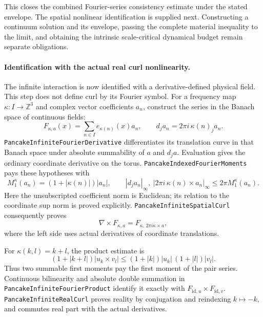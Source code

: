 \documentclass[11pt]{article}
\theoremstyle{definition}
\begin{document}
This closes the combined Fourier-series consistency estimate under the
stated envelope. The spatial nonlinear identification is supplied next.
Constructing a continuum solution and its envelope, passing the complete
material inequality to the limit, and obtaining the intrinsic
scale-critical dynamical budget remain separate obligations.

\paragraph{Identification with the actual real curl nonlinearity.}
The infinite interaction is now identified with a derivative-defined
physical field. This step does not define curl by its Fourier symbol.
For a frequency map $\kappa:I\to\mathbb Z^3$ and complex vector coefficients
$a_n$, construct the series in the Banach space of continuous fields:
\[
 F_{\kappa,a}(x)=\sum_{n\in I}e_{\kappa(n)}(x)a_n,\qquad
 d_j a_n=2\pi i\,\kappa(n)_j a_n.
\]
\texttt{PancakeInfiniteFourierDerivative} differentiates its translation
curve in that Banach space under absolute summability of $a$ and $d_ja$.
Evaluation gives the ordinary coordinate derivative on the torus.
\texttt{PancakeIndexedFourierMoments} pays these hypotheses with
\[
 M_1^\kappa(a_n)=(1+|\kappa(n)|)|a_n|,\qquad
 |d_ja_n|_\infty,\ |2\pi i\,\kappa(n)\times a_n|_\infty
       \le 2\pi M_1^\kappa(a_n).
\]
Here the unsubscripted coefficient norm is Euclidean; its relation to the
coordinate sup norm is proved explicitly.
\texttt{PancakeInfiniteSpatialCurl} consequently proves
\[
 \nabla\times F_{\kappa,a}
   = F_{\kappa,\,2\pi i\kappa\times a},
\]
where the left side uses actual derivatives of coordinate translations.

For $\kappa(k,l)=k+l$, the product estimate is
\[
 (1+|k+l|)|u_k\times v_l|
       \le (1+|k|)|u_k|\,(1+|l|)|v_l|.
\]
Thus two summable first moments pay the first moment of the pair series.
Continuous bilinearity and absolute double summation in
\texttt{PancakeInfiniteFourierProduct} identify it exactly with
$F_{\mathrm{id},u}\times F_{\mathrm{id},v}$.
\texttt{PancakeInfiniteRealCurl} proves reality by conjugation and
reindexing $k\mapsto-k$, and commutes real part with the actual derivatives.
\end{document}
